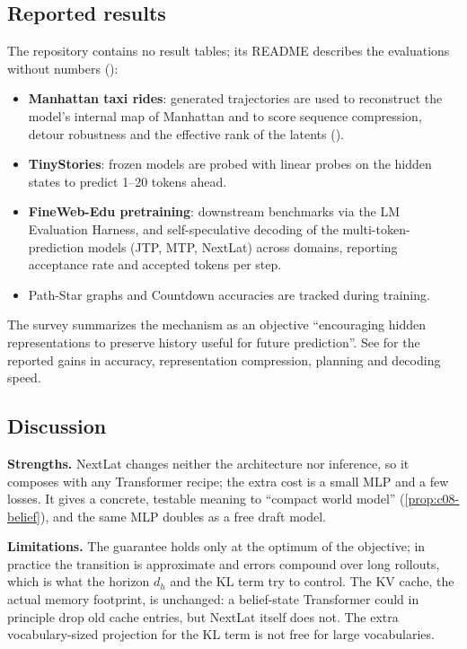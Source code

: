 \subsection{Reported results}

\begin{results}
The repository contains no result tables; its README describes the evaluations without numbers
():
\begin{itemize}
  \item \textbf{Manhattan taxi rides}: generated trajectories are used to reconstruct the model's
  internal map of Manhattan and to score sequence compression, detour robustness and the effective
  rank of the latents ().
  \item \textbf{TinyStories}: frozen models are probed with linear probes on the hidden states to
  predict 1--20 tokens ahead.
  \item \textbf{FineWeb-Edu pretraining}: downstream benchmarks via the LM Evaluation Harness, and
  self-speculative decoding of the multi-token-prediction models (JTP, MTP, NextLat) across domains,
  reporting acceptance rate and accepted tokens per step.
  \item Path-Star graphs and Countdown accuracies are tracked during training.
\end{itemize}
The survey \citep{zhoubian2026memory} summarizes the mechanism as an objective ``encouraging hidden
representations to preserve history useful for future prediction''. See \citet{teoh2026nextlat}
for the reported gains in accuracy, representation compression, planning and decoding speed.
\end{results}

\subsection{Discussion}

\textbf{Strengths.} NextLat changes neither the architecture nor inference, so it composes with any
Transformer recipe; the extra cost is a small MLP and a few losses. It gives a concrete,
testable meaning to ``compact world model'' (\cref{prop:c08-belief}), and the same MLP doubles as a
free draft model.

\textbf{Limitations.} The guarantee holds only at the optimum of the objective; in practice the
transition is approximate and errors compound over long rollouts, which is what the horizon
$d_h$ and the KL term try to control. The KV cache, the actual memory footprint, is unchanged: a
belief-state Transformer could in principle drop old cache entries, but NextLat itself does not.
The extra vocabulary-sized projection for the KL term is not free for large vocabularies.

